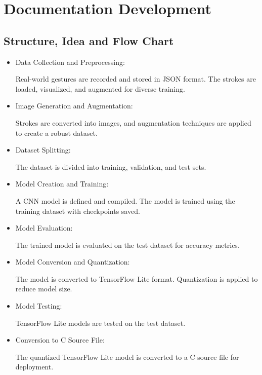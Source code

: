 %
%


\chapter{Documentation Development}
\label{chapter 7}
\section{Structure, Idea and Flow Chart }

\begin{itemize}
	
	\item Data Collection and Preprocessing:
	
	Real-world gestures are recorded and stored in JSON format. The strokes are loaded, visualized, and augmented for diverse training.
	
	\item Image Generation and Augmentation:
	
	Strokes are converted into images, and augmentation techniques are applied to create a robust dataset.
	
	\item Dataset Splitting:
	
	The dataset is divided into training, validation, and test sets.
	
	\item Model Creation and Training:
	
	A CNN model is defined and compiled. The model is trained using the training dataset with checkpoints saved.
	
	\item Model Evaluation:
	
	The trained model is evaluated on the test dataset for accuracy metrics.
	
	\item Model Conversion and Quantization:
	
	The model is converted to TensorFlow Lite format. Quantization is applied to reduce model size.
	
	\item Model Testing:
	
	TensorFlow Lite models are tested on the test dataset.
	
	\item Conversion to C Source File:
	
	The quantized TensorFlow Lite model is converted to a C source file for deployment.
	
\end{itemize}

